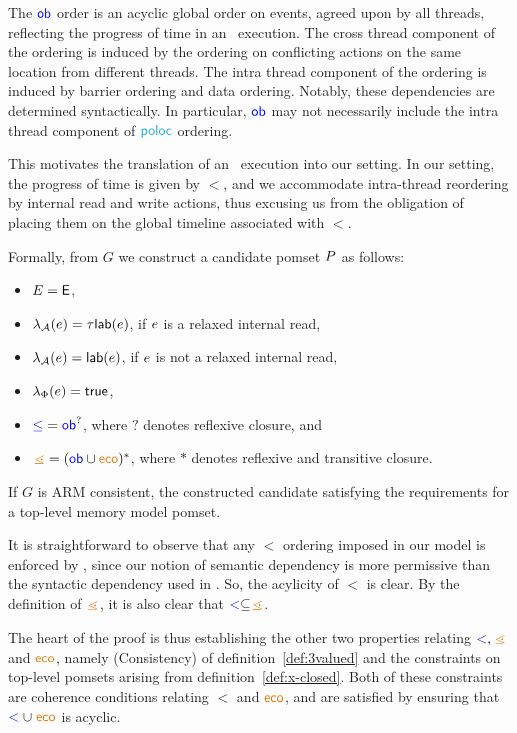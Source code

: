 The ${\mathrel{\color{blue}\mathsf{ob}}}$ order is an acyclic global order on events, agreed upon by all threads, reflecting the progress of time in an \armeight\ execution.  The cross thread component of the ordering is induced by the ordering on conflicting actions on the same location from different threads.    The intra thread component of the ordering is induced by barrier ordering and data ordering.  Notably, these dependencies  are determined syntactically.  In particular, $\mathrel{\color{blue}\mathsf{ob}}$
may not necessarily include the intra thread component of $\rpoloc$ ordering.  

This motivates the translation of an \armeight\ execution into our setting.  In our setting, the progress of time is given by $\lt$, and we accommodate intra-thread reordering by internal read and write actions, thus excusing us from the obligation of placing them on the global timeline associated with $\lt$.  

Formally, from $G$ we construct a candidate pomset $P$ as follows:
\begin{itemize}
\item $E= \textsf{E}$,
\item $\lambda_{\mathcal{A}}(e)=\tau \mathsf{lab}(e)$, if $e$ is a relaxed
  internal read, 
\item $\lambda_{\mathcal{A}}(e)=\mathsf{lab}(e)$, if $e$ is not a relaxed
  internal read,
\item $\lambda_{\Phi}(e)=\mathsf{true}$,
\item ${\mathrel{{\color{blue}\leq}}} = {\mathrel{\color{blue}\mathsf{ob}}}^?$, where $?$ denotes reflexive closure, and
\item ${\gtN} = ({\rob} \cup {\reco})^*$, where $*$ denotes reflexive and transitive closure.
\end{itemize}

\begin{theorem}
  If $G$ is ARM consistent, the constructed candidate satisfying the
  requirements for a top-level memory model pomset.
\end{theorem}
It is straightforward to observe that any $\lt$ ordering imposed in our model is enforced by \armeight, since our notion of semantic dependency is more permissive than the syntactic dependency used in \armeight.   So, the acylicity of $\lt$ is clear.  By the definition of $\gtN$, it is also clear that $\lt \subseteq \gtN$.  

The heart of the proof is thus establishing the other two properties relating $\lt,\gtN$ and $\reco$, namely  (Consistency) of definition~\ref{def:3valued} and the constraints on top-level pomsets arising from definition~\ref{def:x-closed}.  Both of these constraints are coherence conditions relating $\lt$ and $\reco$, and are satisfied by ensuring that  $\lt \cup \reco$ is acyclic.  

